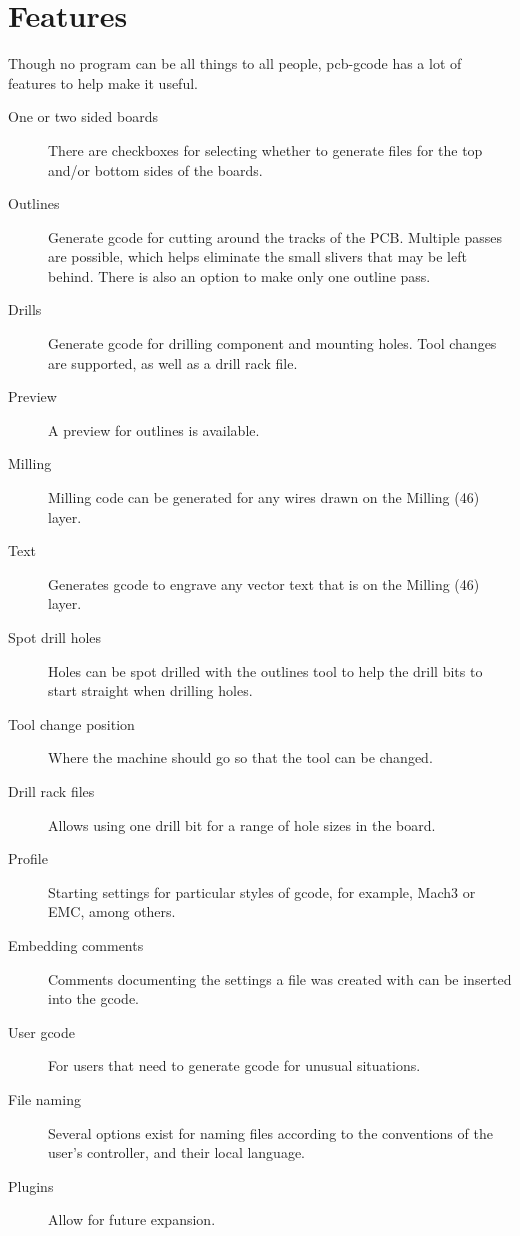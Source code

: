 \documentclass[11pt]{book}
\begin{document}
%
%
\section{Features}\label{sec:Features}

Though no program can be all things to all people, pcb-gcode has a lot of features to help make it useful.

\begin{description}
	\item[One or two sided boards] There are checkboxes for selecting whether to generate files for the top and/or bottom sides of the boards.
	\item[Outlines] Generate gcode for cutting around the tracks of the PCB. Multiple passes are possible, which helps eliminate the small slivers that may be left behind. There is also an option to make only one outline pass.
	\item[Drills] Generate gcode for drilling component and mounting holes. Tool changes are supported, as well as a drill rack file.
	\item[Preview] A preview for outlines is available.
	\item[Milling] Milling code can be generated for any wires drawn on the Milling (46) layer.
	\item[Text] Generates gcode to engrave any vector text that is on the Milling (46) layer.
	\item[Spot drill holes] Holes can be spot drilled with the outlines tool to help the drill bits to start straight when drilling holes.
	\item[Tool change position] Where the machine should go so that the tool can be changed.
	\item[Drill rack files] Allows using one drill bit for a range of hole sizes in the board.
	\item[Profile] Starting settings for particular styles of gcode, for example, Mach3 or EMC, among others.
	\item[Embedding comments] Comments documenting the settings a file was created with can be inserted into the gcode.
	\item[User gcode] For users that need to generate gcode for unusual situations.
	\item[File naming] Several options exist for naming files according to the conventions of the user's controller, and their local language.
	\item[Plugins] Allow for future expansion.
\end{description}
\end{document}

